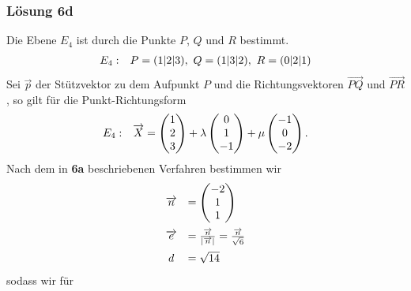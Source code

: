 \subsubsection{Lösung 6d}
Die Ebene $\displaystyle E_{4}$ ist durch die Punkte $\displaystyle P$, $\displaystyle Q$ und $\displaystyle R$ bestimmt. 
\begin{equation*}
	\begin{array}{ r l }
		E_{4} : & P=( 1|2|3) ,\ Q=( 1|3|2) ,\ R=( 0|2|1)
	\end{array}
\end{equation*}
Sei $\displaystyle \vec{p}$ der Stützvektor zu dem Aufpunkt $\displaystyle P$ und die Richtungsvektoren $\displaystyle \overrightarrow{PQ}$ und $\displaystyle \overrightarrow{PR}$, so gilt für die Punkt-Richtungsform
\begin{equation*}
	\begin{array}{ r l }
		E_{4} : & \vec{X} =\begin{pmatrix}
			1\\
			2\\
			3
		\end{pmatrix} +\lambda \begin{pmatrix}
			0\\
			1\\
			-1
		\end{pmatrix} +\mu \begin{pmatrix}
			-1\\
			0\\
			-2
		\end{pmatrix}\text{.}
	\end{array}
\end{equation*}
Nach dem in \textbf{6a }beschriebenen Verfahren bestimmen wir
\begin{equation*}
	\begin{array}{ c l }
		\vec{n} & =\begin{pmatrix}
			-2\\
			1\\
			1
		\end{pmatrix}\vspace{2mm}\\
		\vec{e} & =\frac{\vec{n}}{| \vec{n}| } =\frac{\vec{n}}{\sqrt{6}}\vspace{2mm}\\
		d & =\sqrt{14}
	\end{array}
\end{equation*}
sodass wir für 

